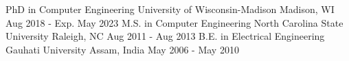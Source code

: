 

\begin{cventries}
  \cventry
    {PhD in Computer Engineering} %
    {University of Wisconsin-Madison} %
    {Madison, WI} %
    {Aug 2018 - Exp. May 2023} %
    {}
  \cventry
    {M.S. in Computer Engineering} %
    {North Carolina State University} %
    {Raleigh, NC} %
    {Aug 2011 - Aug 2013} %
    {}
  \cventry
    {B.E. in Electrical Engineering} %
    {Gauhati University} %
    {Assam, India} %
    {May 2006 - May 2010} %
    {}
\end{cventries}
